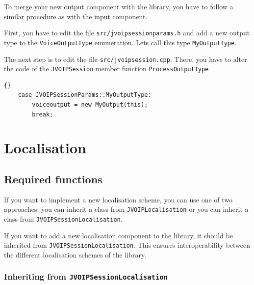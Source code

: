 		To merge your new output component with the library, you have to follow a 
		similar procedure as with the input component. 
		
		First, you have to edit the file {\tt src/jvoipsessionparams.h} and add a new
		output type to the {\tt VoiceOutputType} enumeration. Lets call this type 
		{\tt MyOutputType}.
		
		The next step is to edit the file {\tt src/jvoipsession.cpp}. There, you have
		to alter the code of the {\tt JVOIPSession} member function 
		{\tt ProcessOutputType}
		\begin{lstlisting}[frame=tb]{}
	case JVOIPSessionParams::MyOutputType:
		voiceoutput = new MyOutput(this);
		break;
		\end{lstlisting}

	\section{Localisation}

		\subsection{Required functions}
		
		If you want to implement a new localisation scheme, you can use one of two 
		approaches: you can inherit a class from {\tt JVOIPLocalisation} or you 
		can inherit a class from {\tt JVOIP\-Session\-Localisation}.
		
		If you want to add a new localisation component to the library, it should
		be inherited from {\tt JVOIPSessionLocalisation}. This ensures interoperability
		between the different localisation schemes of the library.
		
			\subsubsection{Inheriting from {\tt JVOIPSessionLocalisation}}
			
